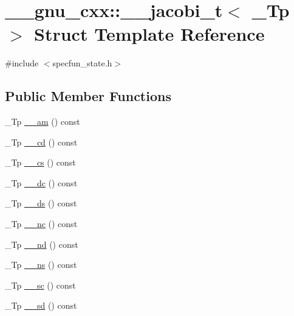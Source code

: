 \hypertarget{struct____gnu__cxx_1_1____jacobi__t}{}\section{\+\_\+\+\_\+gnu\+\_\+cxx\+:\+:\+\_\+\+\_\+jacobi\+\_\+t$<$ \+\_\+\+Tp $>$ Struct Template Reference}
\label{struct____gnu__cxx_1_1____jacobi__t}


{\ttfamily \#include $<$specfun\+\_\+state.\+h$>$}

\subsection*{Public Member Functions}
\begin{DoxyCompactItemize}
\item 
\+\_\+\+Tp \hyperlink{struct____gnu__cxx_1_1____jacobi__t_a76972558b67ea09d675507c4b0e32210}{\+\_\+\+\_\+am} () const 
\item 
\+\_\+\+Tp \hyperlink{struct____gnu__cxx_1_1____jacobi__t_a4a6acb7855e8cec17d9002d6013dab06}{\+\_\+\+\_\+cd} () const 
\item 
\+\_\+\+Tp \hyperlink{struct____gnu__cxx_1_1____jacobi__t_a45ec430ed35735083ef742a65e0028ea}{\+\_\+\+\_\+cs} () const 
\item 
\+\_\+\+Tp \hyperlink{struct____gnu__cxx_1_1____jacobi__t_ae4726519ab3996d2785dd41a8a076aef}{\+\_\+\+\_\+dc} () const 
\item 
\+\_\+\+Tp \hyperlink{struct____gnu__cxx_1_1____jacobi__t_a3fe566667af84c4207d406e748f45f79}{\+\_\+\+\_\+ds} () const 
\item 
\+\_\+\+Tp \hyperlink{struct____gnu__cxx_1_1____jacobi__t_abb9ada1af6b2f198a936e76c8efe61fa}{\+\_\+\+\_\+nc} () const 
\item 
\+\_\+\+Tp \hyperlink{struct____gnu__cxx_1_1____jacobi__t_a9dfdfad7971ee073337046b153e89527}{\+\_\+\+\_\+nd} () const 
\item 
\+\_\+\+Tp \hyperlink{struct____gnu__cxx_1_1____jacobi__t_aaf38203e7c88baa477db5ef4d00f3dc4}{\+\_\+\+\_\+ns} () const 
\item 
\+\_\+\+Tp \hyperlink{struct____gnu__cxx_1_1____jacobi__t_a93b36fa52f921322ec37115d12f818d2}{\+\_\+\+\_\+sc} () const 
\item 
\+\_\+\+Tp \hyperlink{struct____gnu__cxx_1_1____jacobi__t_a83a43574728d91cd313e7df57450b913}{\+\_\+\+\_\+sd} () const 
\end{DoxyCompactItemize}
